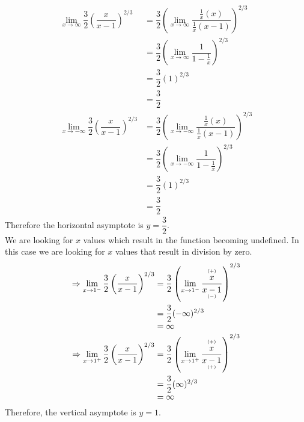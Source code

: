 \documentclass{hwset}
\newcommand{\mtiny}[1]{\mbox{\tiny $#1$}}
\begin{document}
	\item
	\begin{solution}
		\begin{align*}
			\lim_{x\to \infty} \dfrac{3}{2} \left(\dfrac{x}{x-1}\right)^{2/3} &=
				\dfrac{3}{2} \left(\lim_{x\to \infty} \dfrac{\frac{1}{x}(x)}{
				\frac{1}{x} (x-1)}\right)^{2/3} \\
			&= \dfrac{3}{2}\left(\lim_{x\to \infty} \dfrac{1}{1 -
				\frac{1}{x}}\right)^{2/3} \\
			&= \dfrac{3}{2}(1)^{2/3} \\
			&= \dfrac{3}{2} \\
			\lim_{x\to -\infty} \dfrac{3}{2} \left(\dfrac{x}{x-1}\right)^{2/3} &=
				\dfrac{3}{2} \left(\lim_{x\to -\infty} \dfrac{\frac{1}{x}(x)}{
				\frac{1}{x} (x-1)}\right)^{2/3} \\
			&= \dfrac{3}{2}\left(\lim_{x\to -\infty} \dfrac{1}{1 -
				\frac{1}{x}}\right)^{2/3} \\
			&= \dfrac{3}{2}(1)^{2/3} \\
			&= \dfrac{3}{2}
		\end{align*}
		Therefore the horizontal asymptote is $\boxed{y=\dfrac{3}{2}}$. \\
		We are looking for $x$ values which result in the function becoming
		undefined. In this case we are looking for $x$ values that result in
		division by zero.
		\begin{align*}
			\Rightarrow \lim_{x\to 1^-} \dfrac{3}{2}\left(\dfrac{x}{x-1}\right)^{2/3}
				&= \dfrac{3}{2}\left(\lim_{x\to 1^-} \dfrac{\begin{matrix}\mtiny{(+)} \\[-0.3em]
				x\end{matrix}}{\begin{matrix}x-1 \\[-0.6em]
				\mtiny{(-)}\end{matrix}}\right)^{2/3} \\
			&= \dfrac{3}{2}(-\infty)^{2/3} \\
			&= \infty \\
			\Rightarrow \lim_{x\to 1^+} \dfrac{3}{2}\left(\dfrac{x}{x-1}\right)^{2/3}
				&= \dfrac{3}{2}\left(\lim_{x\to 1^+} \dfrac{\begin{matrix}\mtiny{(+)} \\[-0.3em]
				x\end{matrix}}{\begin{matrix}x-1 \\[-0.6em]
				\mtiny{(+)}\end{matrix}}\right)^{2/3} \\
			&= \dfrac{3}{2}(\infty)^{2/3} \\
			&= \infty 
		\end{align*}
		Therefore, the vertical asymptote is $\boxed{y=1}$.
	\end{solution}
\ee
\end{document}
